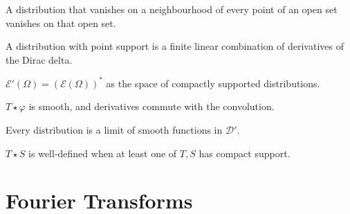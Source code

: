 \begin{theorem}
  \label{thm:distribution-local}
  \leanok
  A distribution that vanishes on a neighbourhood of every point of
  an open set vanishes on that open set.
\end{theorem}

\begin{theorem}
  \label{thm:distribution-pointSupport}
  \leanok
  A distribution with point support is a finite linear combination
  of derivatives of the Dirac delta.
\end{theorem}

\begin{theorem}[Rudin 6.25, compactly supported distributions $= \mathcal E'$]
  \label{thm:E-prime}
  \leanok
  $\mathcal E'(\Omega) = (\mathcal E(\Omega))^*$ as the space of
  compactly supported distributions.
\end{theorem}

\begin{theorem}
  \label{thm:convolution-T-phi}
  \leanok
  $T \star \varphi$ is smooth, and derivatives commute with the
  convolution.
\end{theorem}

\begin{theorem}
  \label{thm:distribution-smooth-approx}
  \leanok
  Every distribution is a limit of smooth functions in $\mathcal D'$.
\end{theorem}

\begin{theorem}
  \label{thm:convolution-distributions}
  \leanok
  $T \star S$ is well-defined when at least one of $T, S$ has compact
  support.
\end{theorem}

\chapter{Fourier Transforms}

